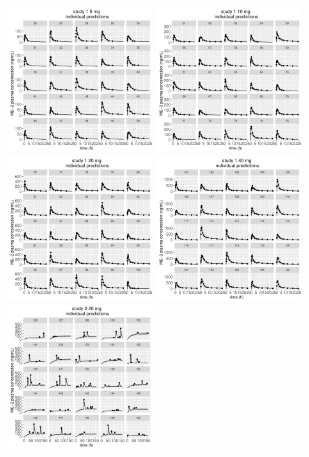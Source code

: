 \documentclass[11pt]{amsart}
\begin{document}
\begin{figure}[htbp]
\includegraphics[width=1.5in,trim=0in 0in 0 0in]{graphics/effCptModelTorsten/effCptModelTorstenPlots011.pdf}
\includegraphics[width=1.5in,trim=0in 0in 0 0in]{graphics/effCptModelTorsten/effCptModelTorstenPlots012.pdf}
\includegraphics[width=1.5in,trim=0in 0in 0 0in]{graphics/effCptModelTorsten/effCptModelTorstenPlots013.pdf}
\includegraphics[width=1.5in,trim=0in 0in 0 0in]{graphics/effCptModelTorsten/effCptModelTorstenPlots014.pdf}
\includegraphics[width=1.5in,trim=0in 0in 0 0in]{graphics/effCptModelTorsten/effCptModelTorstenPlots015.pdf}

\end{figure}
\end{document}
